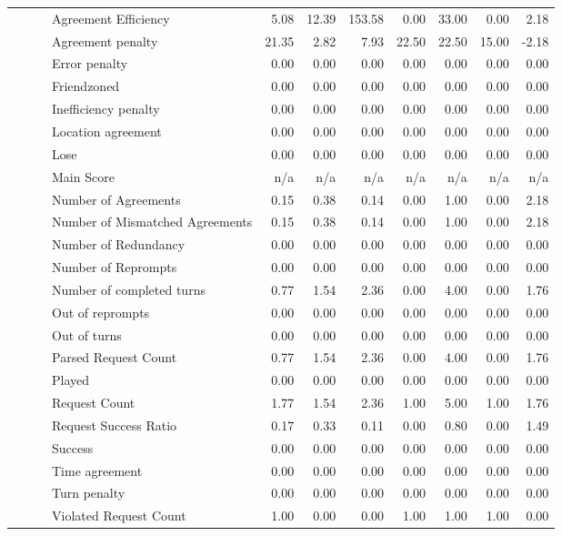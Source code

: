 \begin{tabular}{llllrrrrrrr}
 &  &  & Agreement Efficiency & 5.08 & 12.39 & 153.58 & 0.00 & 33.00 & 0.00 & 2.18 \\
 &  &  & Agreement penalty & 21.35 & 2.82 & 7.93 & 22.50 & 22.50 & 15.00 & -2.18 \\
 &  &  & Error penalty & 0.00 & 0.00 & 0.00 & 0.00 & 0.00 & 0.00 & 0.00 \\
 &  &  & Friendzoned & 0.00 & 0.00 & 0.00 & 0.00 & 0.00 & 0.00 & 0.00 \\
 &  &  & Inefficiency penalty & 0.00 & 0.00 & 0.00 & 0.00 & 0.00 & 0.00 & 0.00 \\
 &  &  & Location agreement & 0.00 & 0.00 & 0.00 & 0.00 & 0.00 & 0.00 & 0.00 \\
 &  &  & Lose & 0.00 & 0.00 & 0.00 & 0.00 & 0.00 & 0.00 & 0.00 \\
 &  &  & Main Score & n/a & n/a & n/a & n/a & n/a & n/a & n/a \\
 &  &  & Number of Agreements & 0.15 & 0.38 & 0.14 & 0.00 & 1.00 & 0.00 & 2.18 \\
 &  &  & Number of Mismatched Agreements & 0.15 & 0.38 & 0.14 & 0.00 & 1.00 & 0.00 & 2.18 \\
 &  &  & Number of Redundancy & 0.00 & 0.00 & 0.00 & 0.00 & 0.00 & 0.00 & 0.00 \\
 &  &  & Number of Reprompts & 0.00 & 0.00 & 0.00 & 0.00 & 0.00 & 0.00 & 0.00 \\
 &  &  & Number of completed turns & 0.77 & 1.54 & 2.36 & 0.00 & 4.00 & 0.00 & 1.76 \\
 &  &  & Out of reprompts & 0.00 & 0.00 & 0.00 & 0.00 & 0.00 & 0.00 & 0.00 \\
 &  &  & Out of turns & 0.00 & 0.00 & 0.00 & 0.00 & 0.00 & 0.00 & 0.00 \\
 &  &  & Parsed Request Count & 0.77 & 1.54 & 2.36 & 0.00 & 4.00 & 0.00 & 1.76 \\
 &  &  & Played & 0.00 & 0.00 & 0.00 & 0.00 & 0.00 & 0.00 & 0.00 \\
 &  &  & Request Count & 1.77 & 1.54 & 2.36 & 1.00 & 5.00 & 1.00 & 1.76 \\
 &  &  & Request Success Ratio & 0.17 & 0.33 & 0.11 & 0.00 & 0.80 & 0.00 & 1.49 \\
 &  &  & Success & 0.00 & 0.00 & 0.00 & 0.00 & 0.00 & 0.00 & 0.00 \\
 &  &  & Time agreement & 0.00 & 0.00 & 0.00 & 0.00 & 0.00 & 0.00 & 0.00 \\
 &  &  & Turn penalty & 0.00 & 0.00 & 0.00 & 0.00 & 0.00 & 0.00 & 0.00 \\
 &  &  & Violated Request Count & 1.00 & 0.00 & 0.00 & 1.00 & 1.00 & 1.00 & 0.00 \\

\end{tabular}
